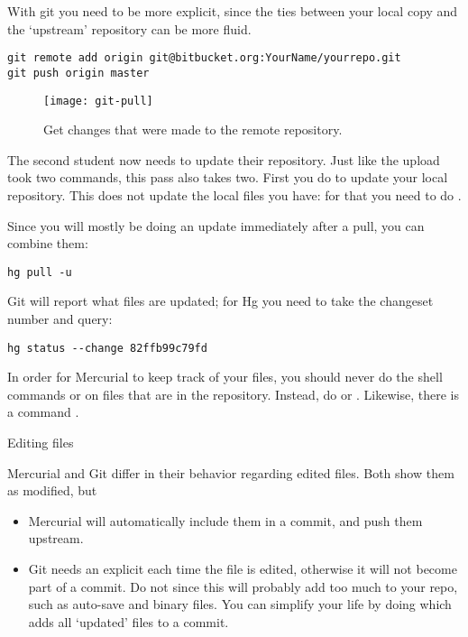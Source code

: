 With git you need to be more explicit, since the ties between your
local copy and the `upstream' repository can be more fluid.
\begin{verbatim}
git remote add origin git@bitbucket.org:YourName/yourrepo.git
git push origin master
\end{verbatim}

\begin{figure}[ht]
  \texttt{[image: git-pull]}
  \caption{Get changes that were made to the remote repository.}
  \label{fig:git-pull}
\end{figure}

The second student now needs to update their repository. Just like the
upload took two commands, this pass also takes two. First you do  to update your local repository. This does not update the
local files you have: for that you need to do .



Since you will mostly be doing an update immediately after a pull, you
can combine them:
\begin{verbatim}
hg pull -u
\end{verbatim}
Git will report what files are updated; for Hg you need to take the
changeset number and query:
\begin{verbatim}
hg status --change 82ffb99c79fd
\end{verbatim}

\begin{remark}
  In order for Mercurial to keep track of your files, you should never do
  the shell commands
   or  on files that are in the repository. Instead, do
   or . Likewise, there is a command .
\end{remark}

 {Editing files}

Mercurial and Git differ in their behavior regarding edited files.
Both show them as modified, but 
\begin{itemize}
\item Mercurial will automatically include them in a commit, and push them upstream.
\item Git needs an explicit  each time the file is edited, otherwise it will not
  become part of a commit. Do not  since this will probably add too much
  to your repo, such as auto-save and binary files.
  You can simplify your life by doing  which adds all `updated' files to a commit.
\end{itemize}

